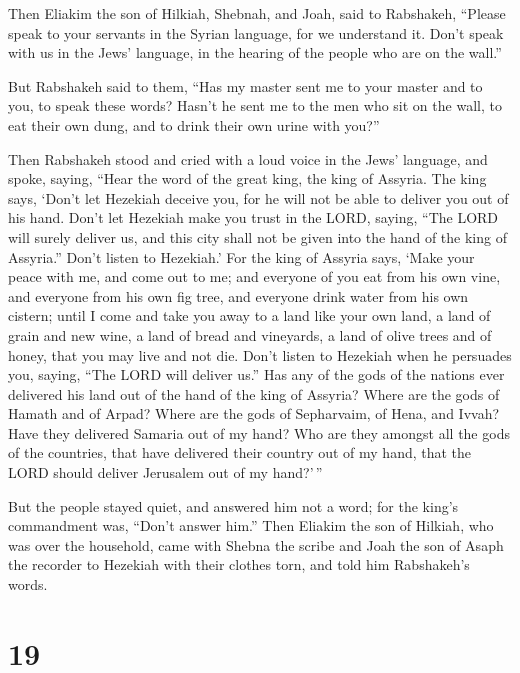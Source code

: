  Then Eliakim the son of Hilkiah, Shebnah, and Joah, said
to Rabshakeh, ``Please speak to your servants in the Syrian language,
for we understand it. Don't speak with us in the Jews' language, in the
hearing of the people who are on the wall.''

 But Rabshakeh said to them, ``Has my master sent me to
your master and to you, to speak these words? Hasn't he sent me to the
men who sit on the wall, to eat their own dung, and to drink their own
urine with you?''

 Then Rabshakeh stood and cried with a loud voice in the
Jews' language, and spoke, saying, ``Hear the word of the great king,
the king of Assyria.  The king says, `Don't let Hezekiah
deceive you, for he will not be able to deliver you out of his hand.
 Don't let Hezekiah make you trust in the LORD, saying,
``The LORD will surely deliver us, and this city shall not be given into
the hand of the king of Assyria.''  Don't listen to
Hezekiah.' For the king of Assyria says, `Make your peace with me, and
come out to me; and everyone of you eat from his own vine, and everyone
from his own fig tree, and everyone drink water from his own cistern;
 until I come and take you away to a land like your own
land, a land of grain and new wine, a land of bread and vineyards, a
land of olive trees and of honey, that you may live and not die. Don't
listen to Hezekiah when he persuades you, saying, ``The LORD will
deliver us.''  Has any of the gods of the nations ever
delivered his land out of the hand of the king of Assyria?
 Where are the gods of Hamath and of Arpad? Where are the
gods of Sepharvaim, of Hena, and Ivvah? Have they delivered Samaria out
of my hand?  Who are they amongst all the gods of the
countries, that have delivered their country out of my hand, that the
LORD should deliver Jerusalem out of my hand?'\,''

 But the people stayed quiet, and answered him not a
word; for the king's commandment was, ``Don't answer him.''
 Then Eliakim the son of Hilkiah, who was over the
household, came with Shebna the scribe and Joah the son of Asaph the
recorder to Hezekiah with their clothes torn, and told him Rabshakeh's
words.

\hypertarget{section-18}{%
\section{19}\label{section-18}}

